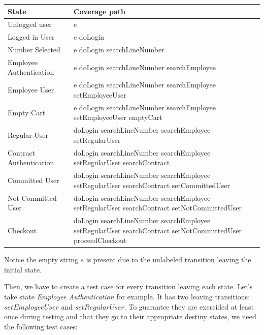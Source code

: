 \begin{center}
\begin{tabular}{| l | p{10cm}|}

\hline

State & Coverage path \\ \hline

Unlogged user & e \\ \hline

Logged in User & e doLogin\\ \hline 

Number Selected & e doLogin searchLineNumber\\ \hline

Employee Authentication & e doLogin searchLineNumber searchEmployee\\ \hline

Employee User & e doLogin searchLineNumber searchEmployee setEmployeeUser \\ \hline

Empty Cart & e doLogin searchLineNumber searchEmployee setEmployeeUser emptyCart \\ \hline

Regular User & doLogin searchLineNumber searchEmployee setRegularUser \\ \hline

Contract Authentication & doLogin searchLineNumber searchEmployee setRegularUser searchContract \\ \hline

Committed User & doLogin searchLineNumber searchEmployee setRegularUser searchContract setCommittedUser \\ \hline

Not Committed User & doLogin searchLineNumber searchEmployee setRegularUser searchContract setNotCommittedUser \\ \hline

Checkout & doLogin searchLineNumber searchEmployee setRegularUser searchContract setNotCommittedUser proceedCheckout\\
\hline
\end{tabular}
\end{center}

Notice the empty string $e$ is present due to the unlabeled transition leaving the initial state.

Then, we have to create a test case for every transition leaving each state. Let's take state \textit{Employee Authentication} for example. It has two leaving transitions: $setEmployeeUser$ and $setRegularUser$. To guarantee they are exercided at least once during testing and that they go to their appropriate destiny states, we need the following test cases:

